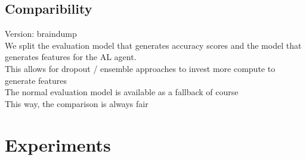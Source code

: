 \documentclass[]{article}
\begin{document}
\subsection{Comparibility}\label{sec:comparibility}
{\color{red} Version: braindump}\\
We split the evaluation model that generates accuracy scores and the model that generates features for the AL agent. \\
This allows for dropout / ensemble approaches to invest more compute to generate features \\
The normal evaluation model is available as a fallback of course \\
This way, the comparison is always fair

\section{Experiments}

\end{document}
